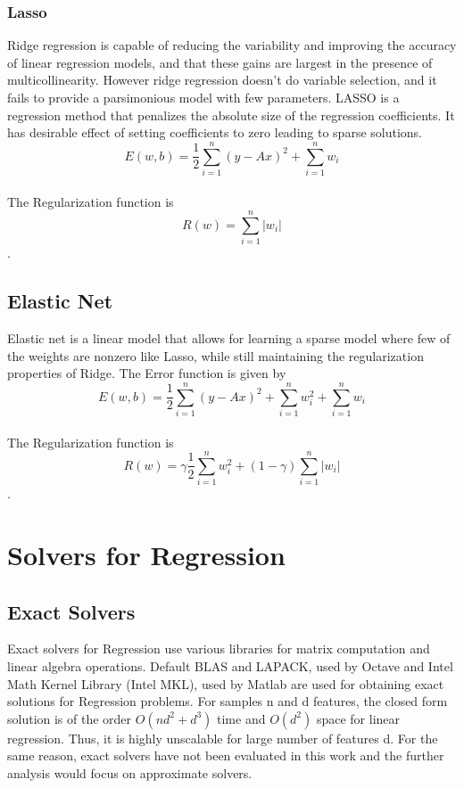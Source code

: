 \documentclass{sigplanconf}
\begin{document}
\subsubsection{Lasso}
Ridge regression is capable of reducing the variability and improving the accuracy of linear regression
models, and that these gains are largest in the presence of multicollinearity. However ridge regression
doesn't do variable selection, and it fails to provide a parsimonious model with few parameters.
LASSO is a regression method that penalizes the absolute size of the regression coefficients. It has
desirable effect of setting coefficients to zero leading to sparse solutions.\\
\begin{equation} E(w,b) =\frac{1}{2} \sum_{i=1}^{n} (y-Ax)^2 + \sum_{i=1}^{n} w_i \end{equation} \\
The Regularization function is
\begin{equation}R(w)=\sum_{i=1}^{n} |w_i|\end{equation}.

\subsection{Elastic Net}
Elastic net is a linear model that allows for learning a sparse model where few of the weights are nonzero
like Lasso, while still maintaining the regularization properties of Ridge. The Error function is given by
\begin{equation}E(w,b) =\frac{1}{2} \sum_{i=1}^{n} (y-Ax)^2 + \sum_{i=1}^{n} w_i^2 + \sum_{i=1}^{n} w_i \end{equation} \\
The Regularization function is
\begin{equation}R(w) = \gamma \frac{1}{2} \sum_{i=1}^{n} w_i^2 + (1-\gamma)\sum_{i=1}^{n} |w_i|\end{equation}.

\section{Solvers for Regression}
\subsection{Exact Solvers}
Exact solvers for Regression use various libraries for matrix computation and linear algebra operations.
Default BLAS \cite{blas} and LAPACK, used by Octave and Intel Math Kernel Library (Intel MKL), used by Matlab
are used for obtaining exact solutions for Regression problems. For samples n and d features, the closed form
solution is of the order \begin {math} O(nd^2 + d^3) \end {math} time and \begin {math} O(d^2) \end {math} space for linear regression.
Thus, it is highly unscalable for large number of features d. For the same reason, exact solvers have not been
evaluated in this work and the further analysis would focus on approximate solvers.
\end{document}
